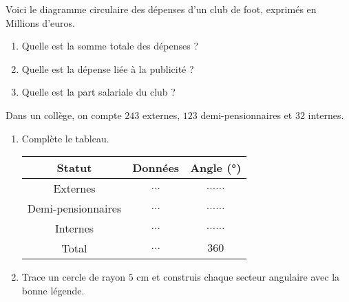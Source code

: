 \begin{pageAD} 



Voici le diagramme circulaire des dépenses d'un club de foot, exprimés en Millions d'euros.

\begin{minipage}{0.58\linewidth}


\end{minipage} 
\begin{minipage}{0.38\linewidth}
\begin{enumerate}[leftmargin=*]
\item Quelle est la somme totale des dépenses ? 
\item Quelle est la dépense liée à la publicité ? 
\item Quelle est la part salariale du club ? 
\end{enumerate}
\end{minipage}



Dans un collège, on compte $243$ externes,  $123$ demi-pensionnaires et $32$ internes.

\begin{enumerate}
\item Complète le tableau.

\begin{tabular}{|c|c|c|}\hline
Statut & Données & Angle (°) \\\hline
Externes &  $\ldots$  & $\ldots\ldots$ \\\hline
Demi-pensionnaires & $\ldots$ & $\ldots\ldots$  \\\hline
Internes & $\ldots$  & $\ldots\ldots$  \\\hline
Total &  $\ldots$ &  $360$ \\\hline
\end{tabular}

\item Trace un cercle de rayon $5$ cm et construis chaque secteur angulaire avec  la bonne légende.
\end{enumerate}


\end{pageAD}


